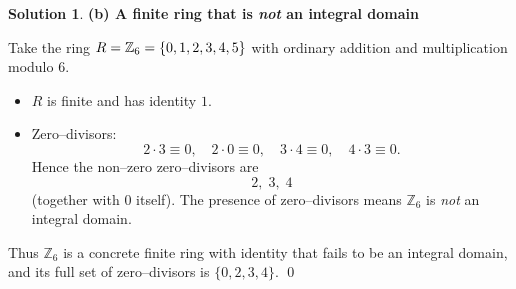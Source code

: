 \documentclass[12pt]{article}
\theoremstyle{definition} %
\newtheorem{solution}{Solution}
\theoremstyle{plain} %
\begin{document}
\begin{solution}
                    \bigskip
                    \textbf{(b)  A finite ring that is \emph{not} an integral domain}
                    
                    Take the ring $\displaystyle R=\Bbb Z_{6}=\{0,1,2,3,4,5\}$ with ordinary
                    addition and multiplication modulo $6$.
                    
                    \begin{itemize}
                        \item $R$ is finite and has identity $1$.
                    
                        \item Zero–divisors:
                              \[
                                 2\cdot 3 \equiv 0,\quad
                                 2\cdot 0 \equiv 0,\quad
                                 3\cdot 4 \equiv 0,\quad
                                 4\cdot 3 \equiv 0.
                              \]
                              Hence the non–zero zero–divisors are
                              \[
                                   \boxed{\;2,\;3,\;4\;}
                              \]
                              (together with $0$ itself).
                              The presence of zero–divisors means $\mathbb{Z}_{6}$ is \emph{not} an
                              integral domain.
                    \end{itemize}
                    
                    Thus $\mathbb{Z}_{6}$ is a concrete finite ring with identity that fails to be
                    an integral domain, and its full set of zero–divisors is
                    $\{0,2,3,4\}$.
                    \qed
                    \end{solution}
\end{document}
